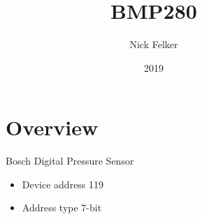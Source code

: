 \documentclass[a4paper,12pt,oneside,pdflatex,italian,final,twocolumn]{article}
\title{ BMP280 }
\author{ Nick Felker }
\date{ 2019 }
\begin{document}
\pagestyle{fancy}



\onecolumn


\begin{figure}
\begin{minipage}{0.47\textwidth}

\section{Overview}
    Bosch Digital Pressure Sensor
    \begin{itemize}
        \item Device address 119
        \item Address type 7-bit
    \end{itemize}


\end{minipage}
\hfill

\end{figure}
\end{document}
